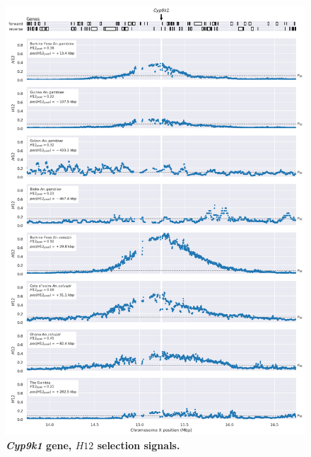 \documentclass[a4paper,11pt,abstracton,hidelinks]{scrartcl}
\begin{document}
\begin{figure}[t!]
	\begin{center}
		\includegraphics*[width=1\linewidth,center]{artwork/locus_cyp9k1_h12_pdist.png}
	\end{center}
	\caption[\textit{Cyp9k1} gene, $H12$ selection signals]{
	\textbf{\textit{Cyp9k1} gene, $H12$ selection signals.}
	} 
	\label{fig:locus_cyp9k1_h12}
\end{figure}
\end{document}
